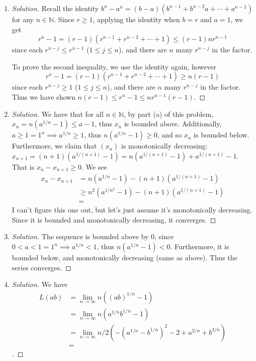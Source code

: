 \documentclass{article}
\newcommand{\N}{{\mathbb N}}
\begin{document}
\begin{enumerate}
	\item \begin{proof}[Solution]\let\qed\relax
		Recall the identity $b^n - a^n =
		(b-a)(b^{n-1} + b^{n-2}a + \cdots + a^{n-1})$
		for any $n \in \N$.
		Since $r \geq 1$,
		applying the identity when $b = r$ and $a = 1$,
		we get
		\[
			r^n - 1 = (r-1)(r^{n-1} + r^{n-2} + \cdots + 1) \leq (r-1)nr^{n-1}
		\]
		since each $r^{n-j} \leq r^{n-1}$ ($1 \leq j \leq n$),
		and there are $n$ many $r^{n-j}$ in the factor. 

		To prove the second inequality,
		we use the identity again,
		however
		\[
			r^n - 1 = (r-1)(r^{n-1} + r^{n-2} + \cdots + 1) \geq n(r-1)
		\]
		since each $r^{n-j} \geq 1$ ($1 \leq j \leq n$),
		and there are $n$ many $r^{n-j}$ in the factor.
		Thus we have shown $n(r-1) \leq r^n - 1 \leq nr^{n-1}(r-1)$.
	\end{proof}
	\item \begin{proof}[Solution]\let\qed\relax
		We have that for all $n \in \N$,
		by part (a) of this problem,
		$x_n = n\left(a^{1/n}-1\right) \leq a - 1$,
		thus $x_n$ is bounded above.
		Additionally, $a \geq 1 = 1^n \implies a^{1/n} \geq 1$,
		thus $n(a^{1/n}-1) \geq 0$, and so $x_n$ is bounded below.
		Furthermore, we claim that $(x_n)$ is monotonically decreasing:
		$x_{n+1} = (n+1)(a^{1/(n+1)} - 1) = n(a^{1/(n+1)} - 1) + a^{1/(n+1)} - 1$. 
		That is $x_n  - x_{n+1} \geq 0$.
		We see
		\begin{align*}
			x_n - x_{n+1}
			&= n\left(a^{1/n} - 1\right) - (n+1)\left(a^{1/(n+1)}-1\right)\\
			&\geq n^2\left(a^{1/n^2} - 1\right) - (n+1)\left(a^{1/(n+1)}-1\right)\\
			&= 
		\end{align*}
		I can't figure this one out, but let's just assume it's monotonically decreasing.
		Since it is bounded and monotonically decreasing,
		it converges.
	\end{proof}
	\item \begin{proof}[Solution]\let\qed\relax
		The sequence is bounded above by $0$,
		since $0 < a < 1 = 1^n \implies a^{1/n} < 1$,
		thus $n(a^{1/n} - 1) < 0$.
		Furthermore, it is bounded below, and monotonically decreasing
		(same as above).
		Thus the series converges.
	\end{proof}
	\item \begin{proof}[Solution]\let\qed\relax
			We have
			\begin{align*}
				L(ab)
				&= \lim_{n\to\infty} n((ab)^{1/n} - 1)\\
				&= \lim_{n\to\infty} n(a^{1/n}b^{1/n} - 1)\\
				&= \lim_{n\to\infty} n/2(-(a^{1/n} - b^{1/n})^2 - 2 + a^{2/n} + b^{2/n})\\
				&=
			\end{align*}
			.
	\end{proof}
\end{enumerate}
\clearpage
\end{document}
